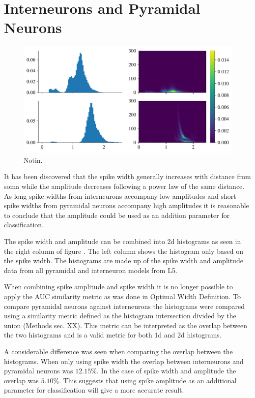 \documentclass[altfont, fleqn]{uiophd}
\renewcommand{\cref}[1]{{\color{viridis_03}\mycref{#1}}}
\begin{document}
\newpage
\section{Interneurons and Pyramidal Neurons}
\begin{figure}[h]
    \begin{center}
        \includegraphics[width=\linewidth]{images/sec_4/int_pyr_hist.pdf}
        \caption{Notin.}
        \label{fig:4_int_pyr_hist}
    \end{center}
\end{figure}
It has been discovered that the spike width generally 
increases with distance from soma while the amplitude
decreases following a power law of the same distance. 
As long spike widths from interneurons accompany 
low amplitudes and short spike widths from pyramidal neurons
accompany high amplitudes it is reasonable to conclude that
the amplitude could be used as an addition parameter for classification. 

The spike width and amplitude
can be combined into
2d histograms as seen in the right column of
figure \cref{fig:4_int_pyr_hist}. 
The left column shows the histogram only based on the spike width.
The histograms are made up of the spike width and amplitude
data from all pyramidal and interneuron models from L5.

When combining spike amplitude and spike width it is no longer
possible to apply the AUC similarity metric as was done in 
Optimal Width Definition.
To compare pyramidal neurons against interneurons
the histograms were compared using a similarity metric 
defined as the histogram intersection divided by the union (Methods sec. XX). 
This metric can be interpreted as the overlap between the two histograms
and is a valid metric for both 1d and 2d histograms.

A considerable difference was seen when comparing the overlap
between the histograms. 
When only using spike width the overlap between interneurons
and pyramidal neurons was $12.15\%$.
In the case of spike width and amplitude the overlap
was $5.10\%$.
This suggests that using spike amplitude as an additional 
parameter for classification will give a more accurate result. 
\newpage
\end{document}
